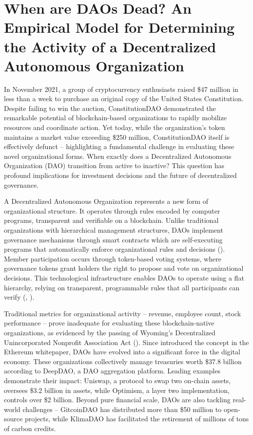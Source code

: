 \chapter[Introduction]{When are DAOs Dead? An Empirical Model for Determining the Activity of a Decentralized Autonomous Organization}

\noindent In November 2021, a group of cryptocurrency enthusiasts raised \$47 million in less than a week to purchase an original copy of the United States Constitution. Despite failing to win the auction, ConstitutionDAO demonstrated the remarkable potential of blockchain-based organizations to rapidly mobilize resources and coordinate action. Yet today, while the organization's token maintains a market value exceeding \$250 million, ConstitutionDAO itself is effectively defunct -- highlighting a fundamental challenge in evaluating these novel organizational forms. When exactly does a Decentralized Autonomous Organization (DAO) transition from active to inactive? This question has profound implications for investment decisions and the future of decentralized governance.

A Decentralized Autonomous Organization represents a new form of organizational structure. It operates through rules encoded by computer programs, transparent and verifiable on a blockchain. Unlike traditional organizations with hierarchical management structures, DAOs implement governance mechanisms through smart contracts which are self-executing programs that automatically enforce organizational rules and decisions (\cite{mik2017smart}). Member participation occurs through token-based voting systems, where governance tokens grant holders the right to propose and vote on organizational decisions. This technological infrastructure enables DAOs to operate using a flat hierarchy, relying on transparent, programmable rules that all participants can verify (\cite{el2020overview}, \cite{witt2024blockchain}).

Traditional metrics for organizational activity -- revenue, employee count, stock performance -- prove inadequate for evaluating these blockchain-native organizations, as evidenced by the passing of Wyoming's Decentralized Unincorporated Nonprofit Association Act (\cite{kerr2024legal}). Since \textcite{buterin2013ethereum} introduced the concept in the Ethereum whitepaper, DAOs have evolved into a significant force in the digital economy. These organizations collectively manage treasuries worth \$37.8 billion according to DeepDAO, a DAO aggregation platform. Leading examples demonstrate their impact: Uniswap, a protocol to swap two on-chain assets, oversees \$3.2 billion in assets, while Optimism, a layer two implementation, controls over \$2 billion. Beyond pure financial scale, DAOs are also tackling real-world challenges -- GitcoinDAO has distributed more than \$50 million to open-source projects, while KlimaDAO has facilitated the retirement of millions of tons of carbon credits.

